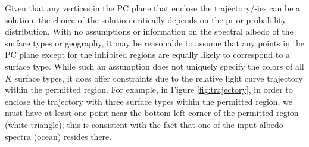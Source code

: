 \documentclass[iop,numberedappendix,apj,]{emulateapj}
\begin{document}
Given that any vertices in the PC plane that enclose the trajectory/-ies can be a solution, the choice of the solution critically depends on the prior probability distribution. 
With no assumptions or information on the spectral albedo of the surface types or geography, it may be reasonable to assume that any points in the PC plane except for the inhibited regions are equally likely to correspond to a surface type. 
While such an assumption does not uniquely specify the colors of all $K$ surface types, it does offer constraints due to the relative light curve trajectory within the permitted region. 
For example, in Figure \ref{fig:trajectory}, in order to enclose the trajectory with three surface types within the permitted region, we must have at least one point near the bottom left corner of the permitted region (white triangle); this is consistent with the fact that one of the input albedo spectra (ocean) resides there. 
\end{document}
